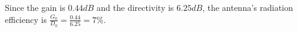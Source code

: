 \documentclass{article} %
\begin{document}
\begin{enumerate}[(1)]
\begin{enumerate}[(a)]
                    Since the gain is $0.44 \si{dB}$ and the directivity is $6.25 \si{dB}$, the antenna's radiation efficiency is $\frac{G_0}{D_0} = \frac{0.44}{6.25} = \boxed{7 \%}$.
          \end{enumerate}

\end{enumerate}
\end{document}
